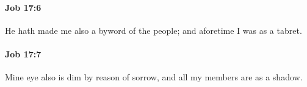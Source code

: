 		\paragraph{Job 17:6} %
			\label{JOB-17-6}

			He hath made me also a byword of the people; and aforetime I was as a tabret.


		\paragraph{Job 17:7} %
			\label{JOB-17-7}

			Mine eye also is dim by reason of sorrow, and all my members are as a shadow.


